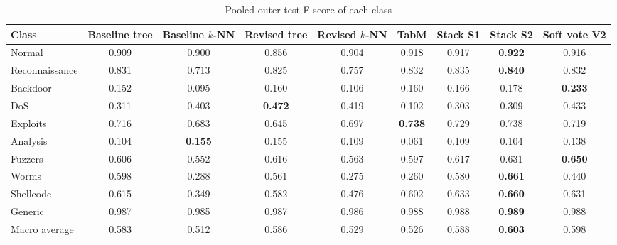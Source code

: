 \documentclass[conference]{IEEEtran}
\newcommand{\knn}{\mbox{$k$-NN}}
\begin{document}
\begin{table}[!t]
    \caption{Pooled outer-test F-score of each class}
    \label{tab:perclass}
    \centering\footnotesize
    \begin{tabular}{@{}lcccccccc@{}}
        \toprule
        Class          & Baseline tree & Baseline \knn  & Revised tree   & Revised \knn & TabM           & Stack S1 & Stack S2       & Soft vote V2 \\
        \midrule
        Normal         & 0.909         & 0.900          & 0.856          & 0.904        & 0.918          & 0.917    & \textbf{0.922} & 0.916 \\
        Reconnaissance & 0.831         & 0.713          & 0.825          & 0.757        & 0.832          & 0.835    & \textbf{0.840} & 0.832 \\
        Backdoor       & 0.152         & 0.095          & 0.160          & 0.106        & 0.160          & 0.166    & 0.178          & \textbf{0.233} \\
        DoS            & 0.311         & 0.403          & \textbf{0.472} & 0.419        & 0.102          & 0.303    & 0.309          & 0.433 \\
        Exploits       & 0.716         & 0.683          & 0.645          & 0.697        & \textbf{0.738} & 0.729    & 0.738          & 0.719 \\
        Analysis       & 0.104         & \textbf{0.155} & 0.155          & 0.109        & 0.061          & 0.109    & 0.104          & 0.138 \\
        Fuzzers        & 0.606         & 0.552          & 0.616          & 0.563        & 0.597          & 0.617    & 0.631          & \textbf{0.650} \\
        Worms          & 0.598         & 0.288          & 0.561          & 0.275        & 0.260          & 0.580    & \textbf{0.661} & 0.440 \\
        Shellcode      & 0.615         & 0.349          & 0.582          & 0.476        & 0.602          & 0.633    & \textbf{0.660} & 0.631 \\
        Generic        & 0.987         & 0.985          & 0.987          & 0.986        & 0.988          & 0.988    & \textbf{0.989} & 0.988 \\
        \midrule
        Macro average  & 0.583         & 0.512          & 0.586          & 0.529        & 0.526          & 0.588    & \textbf{0.603} & 0.598 \\
        \bottomrule
    \end{tabular}
\end{table}
\end{document}
